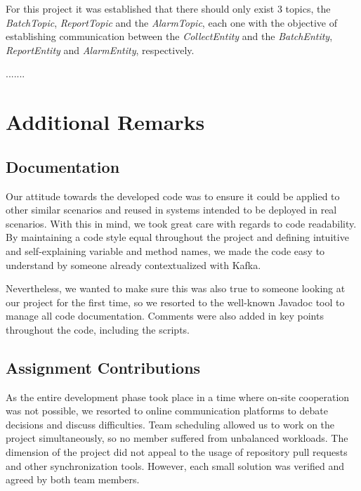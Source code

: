 \documentclass[12pt]{article}
\begin{document}
For this project it was established that there should only exist 3 topics, the \textit{BatchTopic}, \textit{ReportTopic} and the \textit{AlarmTopic}, each one with the objective of establishing communication between the \textit{CollectEntity} and the \textit{BatchEntity}, \textit{ReportEntity} and \textit{AlarmEntity}, respectively.

.......

\newpage
\section{Additional Remarks} %

\subsection{Documentation} %

Our attitude towards the developed code was to ensure it could be applied to other similar scenarios and reused in systems intended to be deployed in real scenarios.
With this in mind, we took great care with regards to code readability.
By maintaining a code style equal throughout the project and defining intuitive and self-explaining variable and method names, we made the code easy to understand
by someone already contextualized with Kafka.

Nevertheless, we wanted to make sure this was also true to someone looking at our project for the first time, so we resorted to the well-known Javadoc 
\cite{javadoc} tool to manage all code documentation.
Comments were also added in key points throughout the code, including the scripts.

\subsection{Assignment Contributions} %

As the entire development phase took place in a time where on-site cooperation was not possible, we resorted to online communication platforms to debate decisions
and discuss difficulties.
Team scheduling allowed us to work on the project simultaneously, so no member suffered from unbalanced workloads.
The dimension of the project did not appeal to the usage of repository pull requests and other synchronization tools.
However, each small solution was verified and agreed by both team members.
\end{document}
